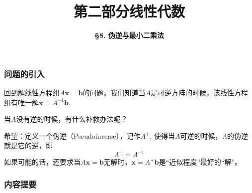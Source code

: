 



\title[Linear Algebra]{\LARGE \bfseries 第二部分\quad 线性代数} %
\author[Pseudoinverse and Least Squares] %
{\Large \bfseries \S 8. 伪逆与最小二乘法}
\date{}






\begin{frame}

\titlepage %

\end{frame}


\begin{frame}
\frametitle{问题的引入}

回到解线性方程组$A\mathbf{x} = \mathbf{b}$的问题。我们知道当$A$是可逆方阵的时候，该线性方程组有唯一解$\mathbf{x} = A^{-1}\mathbf{b}$.

\vspace{1em}

当$A$没有逆的时候，有什么补救办法呢？

\vspace{1em}

希望：定义一个伪逆（Pseudoinverse），记作$A^+$, 使得当$A$可逆的时候，$A$的伪逆就是它的逆，即
$$A^+ = A^{-1}$$
如果可能的话，还要求当$A\mathbf{x} = \mathbf{b}$无解时，$\mathbf{x} = A^+\mathbf{b}$是``近似程度''最好的``解''。

\end{frame}


\begin{frame}
\frametitle{内容提要} %
\tableofcontents %
\end{frame}


